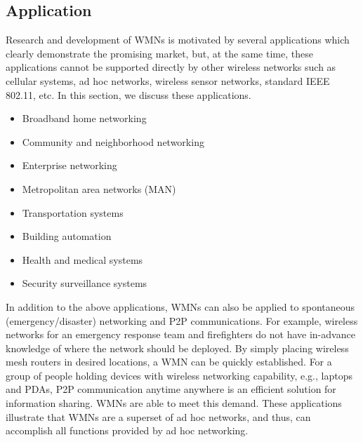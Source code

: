 \documentclass[12pt,a4paper]{report}
\begin{document}

\subsection{Application}
Research and development of WMNs is motivated by several applications which clearly
demonstrate the promising market, but, at the same time, these applications cannot be
supported directly by other wireless networks such as cellular systems, ad hoc networks,
wireless sensor networks, standard IEEE 802.11, etc. In this section, we discuss these
applications.
\begin{itemize}
\item Broadband home networking
\item Community and neighborhood networking
\item Enterprise networking
\item Metropolitan area networks (MAN)
\item Transportation systems
\item Building automation
\item Health and medical systems
\item Security surveillance systems
\end{itemize}
In addition to the above applications, WMNs can also be applied to spontaneous
(emergency/disaster) networking and P2P communications. For example, wireless networks
for an emergency response team and firefighters do not have in-advance knowledge of
where the network should be deployed. By simply placing wireless mesh routers in
desired locations, a WMN can be quickly established.
For a group of people holding
devices with wireless networking capability, e.g., laptops and PDAs, P2P communication
anytime anywhere is an efficient solution for information sharing. WMNs are able to meet this demand. These applications illustrate that WMNs are a superset of ad hoc networks, and
thus, can accomplish all functions provided by ad hoc networking.
\end{document}
